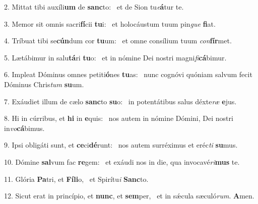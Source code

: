 2. Mittat tibi auxíli\textbf{um} de \textbf{sanc}to: \ast\  et de Sion tu\textit{e}\textbf{á}tur te.\

3. Memor sit omnis sacri\textbf{fí}cii \textbf{tu}i: \ast\  et holocáustum tuum pin\textit{gue} \textbf{fi}at.\

4. Tríbuat tibi se\textbf{cún}dum cor \textbf{tu}um: \ast\  et omne consílium tuum \textit{con}\textbf{fír}met.\

5. Lætábimur in salu\textbf{tá}ri \textbf{tu}o: \ast\  et in nómine Dei nostri magni\textit{fi}\textbf{cá}bimur.\

6. Impleat Dóminus omnes petiti\textbf{ó}nes \textbf{tu}as: \ast\  nunc cognóvi quóniam salvum fecit Dóminus Chris\textit{tum} \textbf{su}um.\

7. Exáudiet illum de cælo \textbf{sanc}to \textbf{su}o: \ast\  in potentátibus salus déxte\textit{ræ} \textbf{e}jus.\

8. Hi in cúrribus, et \textbf{hi} in \textbf{e}quis: \ast\  nos autem in nómine Dómini, Dei nostri in\textit{vo}\textbf{cá}bimus.\

9. Ipsi obligáti sunt, et \textbf{ce}ci\textbf{dé}runt: \ast\  nos autem surréximus et eréc\textit{ti} \textbf{su}mus.\

10. Dómine \textbf{sal}vum fac \textbf{re}gem: \ast\  et exáudi nos in die, qua invocavé\textit{ri}\textbf{mus} te.\

11. Glória \textbf{Pa}tri, et \textbf{Fí}\textbf{li}o, \ast\  et Spirítu\textit{i} \textbf{Sanc}to.\

12. Sicut erat in princípio, et \textbf{nunc}, et \textbf{sem}per, \ast\  et in sǽcula sæculó\textit{rum}. \textbf{A}men.\

